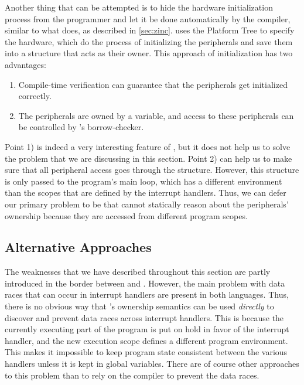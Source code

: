 Another thing that can be attempted is to hide the hardware initialization process from the programmer and let it be done automatically by the compiler, similar to what {\zinc} does, as described in \autoref{sec:zinc}.
{\zinc} uses the Platform Tree to specify the hardware, which do the process of initializing the peripherals and save them into a  structure that acts as their owner.
This approach of initialization has two advantages:

\begin{enumerate}[\hspace{13pt}1)]
    \item Compile-time verification can guarantee that the peripherals get initialized correctly.
    \item The peripherals are owned by a variable, and access to these peripherals can be controlled by {\rust}'s borrow-checker.
\end{enumerate}

Point 1) is indeed a very interesting feature of {\zinc}, but it does not help us to solve the problem that we are discussing in this section.
Point 2) can help us to make sure that all peripheral access goes through the  structure.
However, this structure is only passed to the program's main loop, which has a different environment than the scopes that are defined by the interrupt handlers.
Thus, we can defer our primary problem to be that {\rust} cannot statically reason about the peripherals' ownership because they are accessed from different program scopes.

\subsection{Alternative Approaches}

The weaknesses that we have described throughout this section are partly introduced in the border between {\rust} and {\C}.
However, the main problem with data races that can occur in interrupt handlers are present in both languages.
Thus, there is no obvious way that {\rust}'s ownership semantics can be used \emph{directly} to discover and prevent data races across interrupt handlers.
This is because the currently executing part of the program is put on hold in favor of the interrupt handler, and the new execution scope defines a different program environment.
This makes it impossible to keep program state consistent between the various handlers unless it is kept in global variables.
There are of course other approaches to this problem than to rely on the compiler to prevent the data races.


